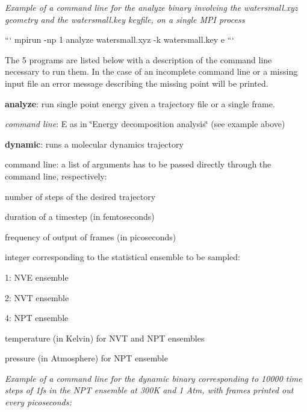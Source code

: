 {\itshape Example of a command line for the analyze binary involving the watersmall.\-xyz geometry and the watersmall.\-key keyfile, on a single M\-P\-I process}

``` mpirun -\/np 1 analyze watersmall.\-xyz -\/k watersmall.\-key e ```

The 5 programs are listed below with a description of the command line necessary to run them. In the case of an incomplete command line or a missing input file an error message describing the missing point will be printed.


\begin{DoxyEnumerate}
\item {\bfseries analyze}\-: run single point energy given a trajectory file or a single frame.
\begin{DoxyItemize}
\item {\itshape command line}\-: E as in \char`\"{}\-Energy decomposition analysis\char`\"{} (see example above)
\end{DoxyItemize}
\item {\bfseries dynamic}\-: runs a molecular dynamics trajectory
\begin{DoxyItemize}
\item command line\-: a list of arguments has to be passed directly through the command line, respectively\-:
\begin{DoxyItemize}
\item number of steps of the desired trajectory
\item duration of a timestep (in femtoseconds)
\item frequency of output of frames (in picoseconds)
\item integer corresponding to the statistical ensemble to be sampled\-:
\begin{DoxyItemize}
\item 1\-: N\-V\-E ensemble
\item 2\-: N\-V\-T ensemble
\item 4\-: N\-P\-T ensemble
\end{DoxyItemize}
\item temperature (in Kelvin) for N\-V\-T and N\-P\-T ensembles
\item pressure (in Atmosphere) for N\-P\-T ensemble
\end{DoxyItemize}
\end{DoxyItemize}

{\itshape Example of a command line for the dynamic binary corresponding to 10000 time steps of 1fs in the N\-P\-T ensemble at 300\-K and 1 Atm, with frames printed out every picoseconds\-:}
\end{DoxyEnumerate}

